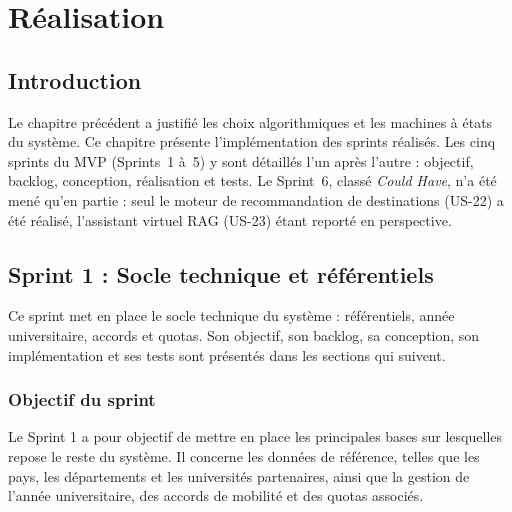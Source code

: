 \chapter{Réalisation}
\label{cha:realisation}
\begingroup
\let\clearpage\relax
\startcontents[chapters]
\endgroup
\newpage

\section*{Introduction}
\justifying
{}
{}

Le chapitre précédent a justifié les choix algorithmiques et les machines à états du système. Ce chapitre présente l'implémentation des sprints réalisés. Les cinq sprints du MVP (Sprints~1 à~5) y sont détaillés l'un après l'autre : objectif, backlog, conception, réalisation et tests. Le Sprint~6, classé \textit{Could Have}, n'a été mené qu'en partie : seul le moteur de recommandation de destinations (US-22) a été réalisé, l'assistant virtuel RAG (US-23) étant reporté en perspective.

\section{Sprint 1 : Socle technique et référentiels}

Ce sprint met en place le socle technique du système : référentiels, année universitaire, accords et quotas. Son objectif, son backlog, sa conception, son implémentation et ses tests sont présentés dans les sections qui suivent.

\subsection{Objectif du sprint}

Le Sprint 1 a pour objectif de mettre en place les principales bases sur lesquelles repose le reste du système. Il concerne les données de référence, telles que les pays, les départements et les universités partenaires, ainsi que la gestion de l'année universitaire, des accords de mobilité et des quotas associés.

